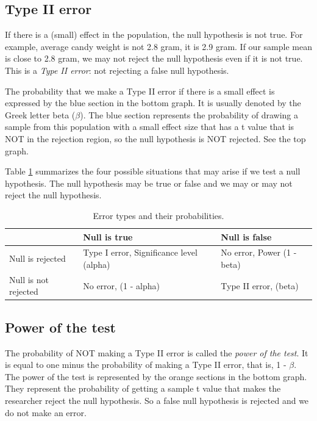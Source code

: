\documentclass[a4paper]{book}
\theoremstyle{definition}
\theoremstyle{definition}
\theoremstyle{definition}
\theoremstyle{remark}
\begin{document}
\subsection{Type II error}\label{typeIIerror}

If there is a (small) effect in the population, the null hypothesis is
not true. For example, average candy weight is not 2.8 gram, it is 2.9
gram. If our sample mean is close to 2.8 gram, we may not reject the
null hypothesis even if it is not true. This is a \emph{Type II error}:
not rejecting a false null hypothesis.

The probability that we make a Type II error if there is a small effect
is expressed by the blue section in the bottom graph. It is usually
denoted by the Greek letter beta (\(\beta\)). The blue section
represents the probability of drawing a sample from this population with
a small effect size that has a t value that is NOT in the rejection
region, so the null hypothesis is NOT rejected. See the top graph.

Table \ref{tab:errortable} summarizes the four possible situations that
may arise if we test a null hypothesis. The null hypothesis may be true
or false and we may or may not reject the null hypothesis.

\begin{table}

\caption{\label{tab:errortable}Error types and their probabilities.}
\centering
\fontsize{8}{8}\selectfont
\begin{tabular}[t]{|l|l|l|}
\hline
   & Null is true & Null is false\\
\hline
Null is rejected & Type I error, Significance level (alpha) & No error, Power (1 - beta)\\
\hline
Null is not rejected & No error, (1 - alpha) & Type II error, (beta)\\
\hline
\end{tabular}
\end{table}

\subsection{Power of the test}\label{power-of-the-test}

The probability of NOT making a Type II error is called the \emph{power
of the test}. It is equal to one minus the probability of making a Type
II error, that is, 1 - \(\beta\). The power of the test is represented
by the orange sections in the bottom graph. They represent the
probability of getting a sample t value that makes the researcher reject
the null hypothesis. So a false null hypothesis is rejected and we do
not make an error.
\end{document}
